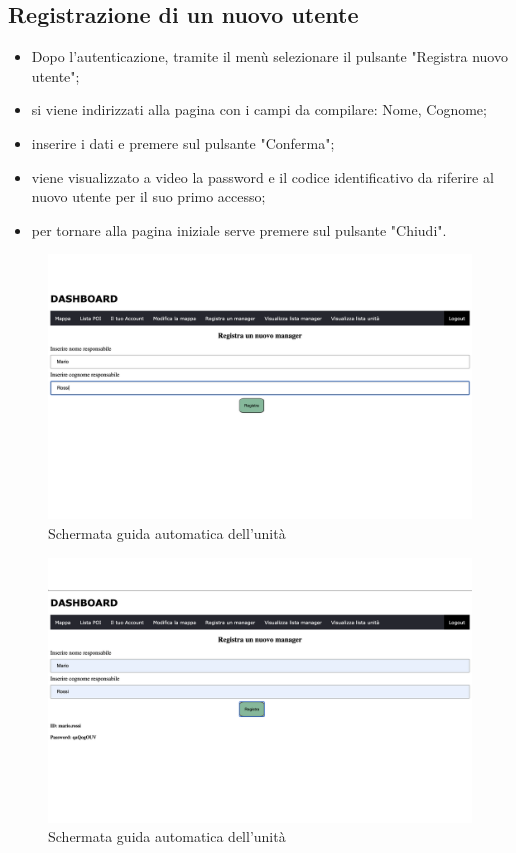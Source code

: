\subsection{Registrazione di un nuovo utente}
\begin{itemize}
    \item Dopo l'autenticazione, tramite il menù selezionare il pulsante "Registra nuovo utente";
    \item si viene indirizzati alla pagina con i campi da compilare: Nome, Cognome;
    \item inserire i dati e premere sul pulsante "Conferma";
    \item viene visualizzato a video la password e il codice identificativo da riferire al nuovo utente per il suo primo accesso;
    \item per tornare alla pagina iniziale serve premere sul pulsante "Chiudi".
\end{itemize}
\begin{figure}[H]
    \centering
    \includegraphics[scale=0.12]{res/images/newmanager_admin.png}
    \caption{Schermata guida automatica dell'unità}
\end{figure}

\begin{figure}[H]
    \centering
    \includegraphics[scale=0.12]{res/images/newmanager_2.png}
    \caption{Schermata guida automatica dell'unità}
\end{figure}

